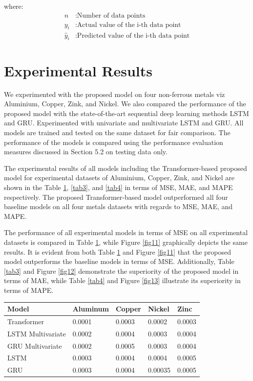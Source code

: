 \documentclass[preprint,12pt]{elsarticle}
\begin{document}
where:
\begin{align*}
	n & : \text{Number of data points} \\
	y_i & : \text{Actual value of the i-th data point} \\
	\hat{y}_i & : \text{Predicted value of the i-th data point}
\end{align*}

\section{Experimental Results}
We experimented with the proposed model on four non-ferrous metals viz Aluminium, Copper, Zink, and Nickel. We also compared the performance of the proposed model with the state-of-the-art sequential deep learning methods LSTM and GRU. Experimented with univariate and multivariate  LSTM and GRU. All models are trained and tested on the same dataset for fair comparison. The performance of the models is compared using the performance evaluation measures discussed in Section 5.2 on testing data only.

\par The experimental results of all models including the Transformer-based proposed model for experimental datasets of Aluminium, Copper, Zink, and Nickel are shown in the Table \ref{tab2},  \ref{tab3},  and \ref{tab4} in terms of MSE, MAE, and MAPE respectively. The proposed Transformer-based model outperformed all four baseline models on all four metals datasets with regards to MSE, MAE, and MAPE. 
\par The performance of all experimental models in terms of MSE on all experimental datasets is compared in Table \ref{tab2}, while Figure \ref{fig11} graphically depicts the same results. It is evident from both Table \ref{tab2} and Figure \ref{fig11} that the proposed model outperforms the baseline models in terms of MSE. Additionally, Table \ref{tab3} and Figure \ref{fig12} demonstrate the superiority of the proposed model in terms of MAE, while Table \ref{tab4} and Figure \ref{fig13} illustrate its superiority in terms of MAPE.

\begin{table}
	{\begin{tabular}{|p{3cm}|p{2cm}|p{2cm}|p{2cm}|p{2cm}|} \hline
			\textbf{Model} & \textbf{Aluminum} & \textbf{Copper} & \textbf{Nickel} & \textbf{Zinc}\\ \hline 
			Transformer & 0.0001 & 0.0003 & 0.0002 & 0.0003\\ \hline 
			LSTM Multivariate & 0.0002 & 0.0004 & 0.0003 & 0.0004\\ \hline 
			GRU Multivariate & 0.0002 & 0.0005 & 0.0003 & 0.0004\\ \hline
			LSTM & 0.0003 & 0.0004 & 0.0004 & 0.0005\\ \hline
			GRU & 0.0003 & 0.0004 & 0.00035 & 0.0005\\ \hline
	\end{tabular}}
	\label{tab2}
\end{table}
\end{document}
